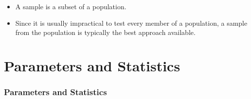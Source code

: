\documentclass[a4paper,12pt]{article}
\begin{document}
\begin{framed}
\begin{itemize}
	\item A sample is a subset of a population.
	\item Since it is usually impractical to test every member of a population, a sample from the population is typically the best approach available.
\end{itemize}
\end{framed}

\section{Parameters and Statistics}	
\subsubsection*{Parameters and Statistics}
\end{document}
